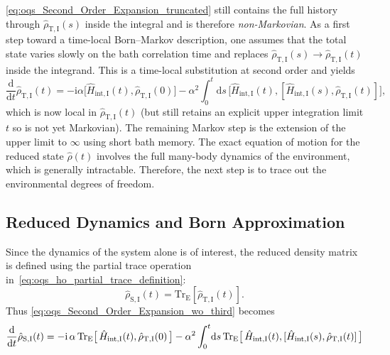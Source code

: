 \autoref{eq:oqs_Second_Order_Expansion_truncated} still contains the full history through $\hat{\rho}_{\mathrm{T},\mathrm{I}}(s)$ inside the integral and is therefore \emph{non-Markovian}. As a first step toward a time-local Born--Markov description, one assumes that the total state varies slowly on the bath correlation time and replaces $\hat{\rho}_{\mathrm{T},\mathrm{I}}(s) \to \hat{\rho}_{\mathrm{T},\mathrm{I}}(t)$ inside the integrand. This is a time-local substitution at second order and yields
\begin{equation}
	\frac{\mathrm{d}}{\mathrm{d}t}\hat{\rho}_{\mathrm{T},\mathrm{I}}(t) = -\mathrm{i} \alpha \big[ \hat{H}_{\mathrm{int},\mathrm{I}}(t), \hat{\rho}_{\mathrm{T},\mathrm{I}}(0) \big]
	- \alpha^2 \int_0^t\!\mathrm{d}s\, \big[ \hat{H}_{\mathrm{int},\mathrm{I}}(t), [ \hat{H}_{\mathrm{int},\mathrm{I}}(s), \hat{\rho}_{\mathrm{T},\mathrm{I}}(t)] \big],
	\label{eq:oqs_Second_Order_Expansion_wo_third}
\end{equation}
which is now local in $\hat{\rho}_{\mathrm{T},\mathrm{I}}(t)$ (but still retains an explicit upper integration limit $t$ so is not yet Markovian). The remaining Markov step is the extension of the upper limit to $\infty$ using short bath memory.
The exact equation of motion for the reduced state $\hat{\rho}(t)$ involves the full many-body dynamics of the environment, which is generally intractable. Therefore, the next step is to trace out the environmental degrees of freedom.


\subsection{Reduced Dynamics and Born Approximation}
\label{subsec:oqs_reduced_dynamics_born_approximation}

Since the dynamics of the system alone is of interest, the reduced density matrix is defined using the partial trace operation in~\autoref{eq:oqs_ho_partial_trace_definition}:
\begin{equation*}
	\hat{\rho}_{\mathrm{S},\mathrm{I}}(t)= \mathrm{Tr}_{\mathrm{E}}[\hat{\rho}_{\mathrm{T},\mathrm{I}}(t)].
\end{equation*}
Thus \autoref{eq:oqs_Second_Order_Expansion_wo_third} becomes
\begin{equation}
	\frac{\mathrm{d}}{\mathrm{d}t}\hat{\rho}_{\mathrm{S},\mathrm{I}}(t) = -\mathrm{i} \, \alpha \, \mathrm{Tr}_{\mathrm{E}}\big[\,\hat{H}_{\mathrm{int},\mathrm{I}}(t),\hat{\rho}_{\mathrm{T},\mathrm{I}}(0)\,\big]
	- \alpha^2 \int_0^t\!\mathrm{d}s\, \mathrm{Tr}_{\mathrm{E}} \big[\,\hat{H}_{\mathrm{int},\mathrm{I}}(t), [\hat{H}_{\mathrm{int},\mathrm{I}}(s), \hat{\rho}_{\mathrm{T},\mathrm{I}}(t)] \,\big] \notag
	\label{eq:oqs_Reduced_Density_Matrix_Evolution}
\end{equation}

